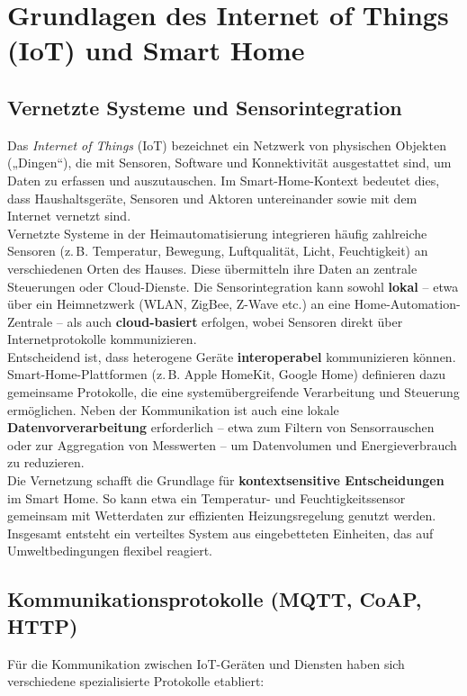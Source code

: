 \section{Grundlagen des Internet of Things (IoT) und Smart Home}

\subsection{Vernetzte Systeme und Sensorintegration}
Das \emph{Internet of Things} (IoT) bezeichnet ein Netzwerk von physischen Objekten („Dingen“), die mit Sensoren, Software und Konnektivität ausgestattet sind, um Daten zu erfassen und auszutauschen. Im Smart-Home-Kontext bedeutet dies, dass Haushaltsgeräte, Sensoren und Aktoren untereinander sowie mit dem Internet vernetzt sind.
\\
Vernetzte Systeme in der Heimautomatisierung integrieren häufig zahlreiche Sensoren (z.\,B. Temperatur, Bewegung, Luftqualität, Licht, Feuchtigkeit) an verschiedenen Orten des Hauses. Diese übermitteln ihre Daten an zentrale Steuerungen oder Cloud-Dienste. Die Sensorintegration kann sowohl \textbf{lokal} – etwa über ein Heimnetzwerk (WLAN, ZigBee, Z-Wave etc.) an eine Home-Automation-Zentrale – als auch \textbf{cloud-basiert} erfolgen, wobei Sensoren direkt über Internetprotokolle kommunizieren.
\\
Entscheidend ist, dass heterogene Geräte \textbf{interoperabel} kommunizieren können. Smart-Home-Plattformen (z.\,B. Apple HomeKit, Google Home) definieren dazu gemeinsame Protokolle, die eine systemübergreifende Verarbeitung und Steuerung ermöglichen. Neben der Kommunikation ist auch eine lokale \textbf{Datenvorverarbeitung} erforderlich – etwa zum Filtern von Sensorrauschen oder zur Aggregation von Messwerten – um Datenvolumen und Energieverbrauch zu reduzieren.
\\
Die Vernetzung schafft die Grundlage für \textbf{kontextsensitive Entscheidungen} im Smart Home. So kann etwa ein Temperatur- und Feuchtigkeitssensor gemeinsam mit Wetterdaten zur effizienten Heizungsregelung genutzt werden. Insgesamt entsteht ein verteiltes System aus eingebetteten Einheiten, das auf Umweltbedingungen flexibel reagiert. \autocite{IoT}
\\
\subsection{Kommunikationsprotokolle (MQTT, CoAP, HTTP)}
Für die Kommunikation zwischen IoT-Geräten und Diensten haben sich verschiedene spezialisierte Protokolle etabliert:
\\
